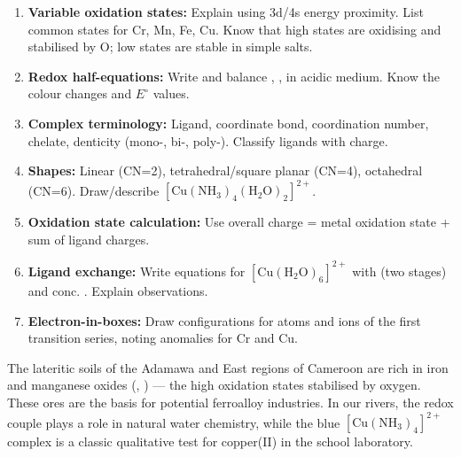 \documentclass[11pt]{article}
\newcounter{popsec}
\newcounter{popsub}
\newcommand{\courssub}[1]{%
  \stepcounter{popsub}%
  \par\vspace{9pt}\noindent{\popxbold\fontsize{11.5}{13}\selectfont\color{popink}{\color{poporange}\thepopsec.\thepopsub}\hspace{6pt}#1}\par\nopagebreak\vspace{4pt}
}
\begin{document}
\courssub{Summary and Exam Focus}

\begin{aretenir}
\begin{enumerate}
\item \textbf{Variable oxidation states:} Explain using 3d/4s energy proximity. List common states for Cr, Mn, Fe, Cu. Know that high states are oxidising and stabilised by O; low states are stable in simple salts.
\item \textbf{Redox half-equations:} Write and balance , ,  in acidic medium. Know the colour changes and $E^\circ$ values.
\item \textbf{Complex terminology:} Ligand, coordinate bond, coordination number, chelate, denticity (mono-, bi-, poly-). Classify ligands with charge.
\item \textbf{Shapes:} Linear (CN=2), tetrahedral/square planar (CN=4), octahedral (CN=6). Draw/describe \ensuremath{\mathrm{[Cu(NH_{3})_{4}(H_{2}O)_{2}]^{2+}}}.
\item \textbf{Oxidation state calculation:} Use overall charge = metal oxidation state + sum of ligand charges.
\item \textbf{Ligand exchange:} Write equations for \ensuremath{\mathrm{[Cu(H_{2}O)_{6}]^{2+}}} with  (two stages) and conc. . Explain observations.
\item \textbf{Electron-in-boxes:} Draw configurations for atoms and ions of the first transition series, noting anomalies for Cr and Cu.
\end{enumerate}
\end{aretenir}

\begin{savaistu}
The lateritic soils of the Adamawa and East regions of Cameroon are rich in iron and manganese oxides (, ) — the high oxidation states stabilised by oxygen. These ores are the basis for potential ferroalloy industries. In our rivers, the  redox couple plays a role in natural water chemistry, while the blue \ensuremath{\mathrm{[Cu(NH_{3})_{4}]^{2+}}} complex is a classic qualitative test for copper(II) in the school laboratory.
\end{savaistu}
\end{document}
